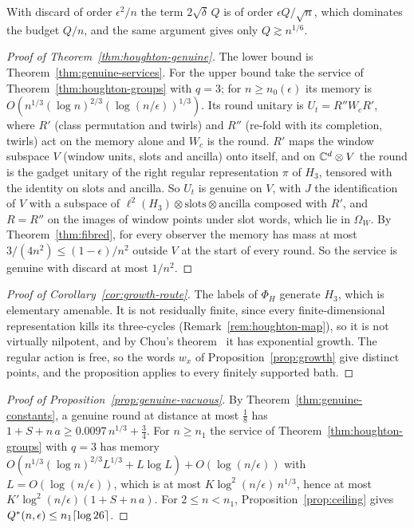With discard of order $\epsilon^2/n$ the term $2\sqrt\delta\,Q$ is of order $\epsilon Q/\sqrt n$, which dominates the budget $Q/n$, and the same argument gives only $Q\gtrsim n^{1/6}$.

\begin{proof}[Proof of Theorem~\ref{thm:houghton-genuine}]
The lower bound is Theorem~\ref{thm:genuine-services}. For the upper bound take the service of Theorem~\ref{thm:houghton-groups} with $q=3$; for $n\ge n_0(\epsilon)$ its memory
is $O(n^{1/3}(\log n)^{2/3}(\log(n/\epsilon))^{1/3})$. Its round unitary is $U_t=R''W_cR'$, where $R'$ (class permutation and twirls) and $R''$ (re-fold with its completion, twirls)
act on the memory alone and $W_c$ is the round. $R'$ maps the window subspace $V$ (window units, slots and ancilla) onto itself, and on $\mathbb C^d\otimes V$ the round is the gadget unitary
of the right regular representation $\pi$ of $H_3$, tensored with the identity on slots and ancilla. So $U_t$ is genuine on $V$, with $J$ the identification of $V$ with a
subspace of $\ell^2(H_3)\otimes\text{slots}\otimes\text{ancilla}$ composed with $R'$, and $R=R''$ on the images of window points under slot words, which lie in $\Omega_W$. By
Theorem~\ref{thm:fibred}, for every observer the memory has mass at most $3/(4n^2)\le(1-\epsilon)/n^2$ outside $V$ at the start of every round. So the service is genuine with
discard at most $1/n^2$.
\end{proof}

\begin{proof}[Proof of Corollary~\ref{cor:growth-route}]
The labels of $\Phi_H$ generate $H_3$, which is elementary amenable. It is not residually finite, since every finite-dimensional representation kills its three-cycles
(Remark~\ref{rem:houghton-map}), so it is not virtually nilpotent, and by Chou's theorem~\cite[Theorem~3.2]{Chou1980} it has exponential growth. The regular action is free, so the
words $w_x$ of Proposition~\ref{prop:growth} give distinct points, and the proposition applies to every finitely supported bath.
\end{proof}

\begin{proof}[Proof of Proposition~\ref{prop:genuine-vacuous}]
By Theorem~\ref{thm:genuine-constants}, a genuine round at distance at most $\frac18$ has $1+S+n\,a\ge0.0097\,n^{1/3}+\frac34$. For $n\ge n_1$ the service of
Theorem~\ref{thm:houghton-groups} with $q=3$ has memory $O(n^{1/3}(\log n)^{2/3}L^{1/3}+L\log L)+O(\log(n/\epsilon))$ with $L=O(\log(n/\epsilon))$, which is at most
$K\log^2(n/\epsilon)\,n^{1/3}$, hence at most $K'\log^2(n/\epsilon)(1+S+n\,a)$. For $2\le n<n_1$, Proposition~\ref{prop:ceiling} gives $Q^{*}(n,\epsilon)\le n_1\lceil\log26\rceil$.
\end{proof}

